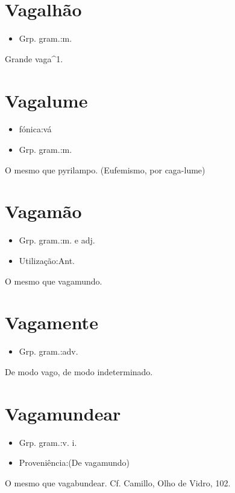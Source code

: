 \documentclass{article}
\begin{document}
\section{Vagalhão}
\begin{itemize}
\item {Grp. gram.:m.}
\end{itemize}
Grande vaga^1.
\section{Vagalume}
\begin{itemize}
\item {fónica:vá}
\end{itemize}
\begin{itemize}
\item {Grp. gram.:m.}
\end{itemize}
O mesmo que \textunderscore pyrilampo\textunderscore .
(Eufemismo, por \textunderscore caga-lume\textunderscore )
\section{Vagamão}
\begin{itemize}
\item {Grp. gram.:m.  e  adj.}
\end{itemize}
\begin{itemize}
\item {Utilização:Ant.}
\end{itemize}
O mesmo que \textunderscore vagamundo\textunderscore .
\section{Vagamente}
\begin{itemize}
\item {Grp. gram.:adv.}
\end{itemize}
De modo vago, de modo indeterminado.
\section{Vagamundear}
\begin{itemize}
\item {Grp. gram.:v. i.}
\end{itemize}
\begin{itemize}
\item {Proveniência:(De \textunderscore vagamundo\textunderscore )}
\end{itemize}
O mesmo que \textunderscore vagabundear\textunderscore . Cf. Camillo, \textunderscore Olho de Vidro\textunderscore , 102.
\end{document}
